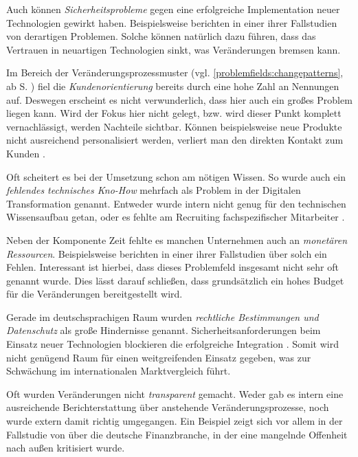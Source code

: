 Auch können \textit{Sicherheitsprobleme} gegen eine erfolgreiche Implementation neuer Technologien gewirkt haben. Beispielsweise berichten  in einer ihrer Fallstudien von derartigen Problemen. Solche können natürlich dazu führen, dass das Vertrauen in neuartigen Technologien sinkt, was Veränderungen bremsen kann.

Im Bereich der Veränderungsprozessmuster (vgl. \ref{problemfields:changepatterns}, ab S. \pageref{problemfields:changepatterns}) fiel die \textit{Kundenorientierung} bereits durch eine hohe Zahl an Nennungen auf. Deswegen erscheint es nicht verwunderlich, dass hier auch ein großes Problem liegen kann. Wird der Fokus hier nicht gelegt, bzw. wird dieser Punkt komplett vernachlässigt, werden Nachteile sichtbar. Können beispielsweise neue Produkte nicht ausreichend personalisiert werden, verliert man den direkten Kontakt zum Kunden \cite[S. 20]{kremins_2018_2018}.

Oft scheitert es bei der Umsetzung schon am nötigen Wissen. So wurde auch ein \textit{fehlendes technisches Kno-How} mehrfach als Problem in der Digitalen Transformation genannt. Entweder wurde intern nicht genug für den technischen Wissensaufbau getan, oder es fehlte am Recruiting fachspezifischer Mitarbeiter \cite[S. 37]{kawohl_digitale_2016}.

Neben der Komponente Zeit fehlte es  manchen Unternehmen auch an \textit{monetären Ressourcen}. Beispielsweise berichten  in einer ihrer Fallstudien über solch ein Fehlen. Interessant ist hierbei, dass dieses Problemfeld insgesamt nicht sehr oft genannt wurde. Dies lässt darauf schließen, dass grundsätzlich ein hohes Budget für die Veränderungen bereitgestellt wird.

Gerade im deutschsprachigen Raum wurden \textit{rechtliche Bestimmungen und Datenschutz} als große Hindernisse genannt. Sicherheitsanforderungen beim Einsatz neuer Technologien blockieren die erfolgreiche Integration \cite[S. 7]{depiereux_studie_2018}. Somit wird nicht genügend Raum für einen weitgreifenden Einsatz gegeben, was zur Schwächung im internationalen Marktvergleich führt.

Oft wurden Veränderungen nicht \textit{transparent} gemacht. Weder gab es intern eine ausreichende Berichterstattung über anstehende Veränderungsprozesse, noch wurde extern damit richtig umgegangen. Ein Beispiel zeigt sich vor allem in der Fallstudie von  über die deutsche Finanzbranche, in der eine mangelnde Offenheit nach außen kritisiert wurde.

